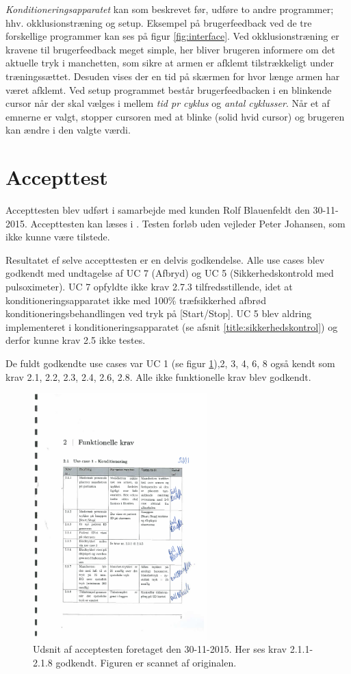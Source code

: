 \textit{Konditioneringsapparatet} kan som beskrevet før, udføre to andre programmer; hhv. okklusionstræning og setup. Eksempel på brugerfeedback ved de tre forskellige programmer kan ses på figur \ref{fig:interface}. Ved okklusionstræning er kravene til brugerfeedback meget simple, her bliver brugeren informere om det aktuelle tryk i manchetten, som sikre at armen er afklemt tilstrækkeligt under træningssættet. Desuden vises der en tid på skærmen for hvor længe armen har været afklemt. Ved setup programmet består brugerfeedbacken i en blinkende cursor når der skal vælges i mellem \textit{tid pr cyklus} og \textit{antal cyklusser}. Når et af emnerne er valgt, stopper cursoren med at blinke (solid hvid cursor) og brugeren kan ændre i den valgte værdi.

\section{Accepttest}
Accepttesten blev udført i samarbejde med kunden Rolf Blauenfeldt den 30-11-2015. Accepttesten kan læses i . Testen forløb uden vejleder Peter Johansen, som ikke kunne være tilstede.

Resultatet ef selve accepttesten er en delvis godkendelse. Alle use cases blev godkendt med undtagelse af UC 7 (Afbryd) og UC 5 (Sikkerhedskontrold med pulsoximeter). UC 7 opfyldte ikke krav 2.7.3 tilfredsstillende, idet at konditioneringsapparatet ikke med 100\% træfsikkerhed afbrød konditioneringsbehandlingen ved tryk på [Start/Stop]. UC 5 blev aldring implementeret i konditioneringsapparatet (se afsnit \ref{title:sikkerhedskontrol}) og derfor kunne krav 2.5 ikke testes.

De fuldt godkendte use cases var UC 1 (se figur \ref{fig:udsnitAfAccepttest}),2, 3, 4, 6, 8 også kendt som krav 2.1, 2.2, 2.3, 2.4, 2.6, 2.8. Alle ikke funktionelle krav blev godkendt. 

\begin{figure}[H]
	\centering
	\includegraphics[width=0.6\textwidth]{billeder/udsnitAfAccepttest.pdf}
	\caption{Udsnit af acceptesten foretaget den 30-11-2015. Her ses krav 2.1.1-2.1.8 godkendt. Figuren er scannet af originalen.}\label{fig:udsnitAfAccepttest}
\end{figure}